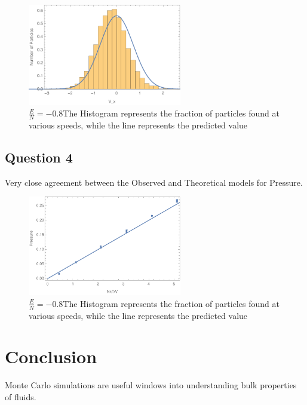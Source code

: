 \documentclass{article}
\begin{document}
\begin{figure}[!htb]
	\begin{center}
		\includegraphics[width=0.6\textwidth]{p3b.pdf}
	\end{center}
	\caption{$\frac{E}{N} = -0.8$The Histogram represents the fraction of particles found at various speeds, while the line represents the predicted value}
\label{fig:qual}
\end{figure}
\FloatBarrier


\subsection{Question 4}

Very close agreement between the Observed and Theoretical models for Pressure.

\begin{figure}[!htb]
	\begin{center}
		\includegraphics[width=0.6\textwidth]{p4.pdf}
	\end{center}
	\caption{$\frac{E}{N} = -0.8$The Histogram represents the fraction of particles found at various speeds, while the line represents the predicted value}
\label{fig:qual}
\end{figure}
\FloatBarrier






\section{Conclusion}

Monte Carlo simulations are useful windows into understanding bulk properties of fluids.
\end{document}
